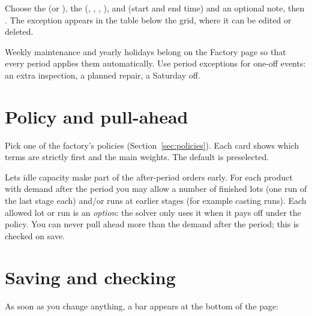 
Choose the  (or ), the  (, , ,
),  and  (start and end time) and an optional note, then . The exception
appears in the  table below the grid, where it can be edited or deleted.

\begin{tip}
Weekly maintenance and yearly holidays belong on the Factory page so that every period applies them
automatically. Use period exceptions for one-off events: an extra inspection, a planned repair, a Saturday off.
\end{tip}

\section{Policy and pull-ahead}\label{sec:pull-ahead}


\begin{description}[style=nextline, leftmargin=1.2em, font=\bfseries\color{brand}]
  \item[Objective policy] Pick one of the factory's policies (Section~\ref{sec:policies}). Each card shows
        which terms are strictly first and the main weights. The default is preselected.
  \item[Pull ahead for long-term orders] Lets idle capacity make part of the after-period orders early. For
        each product with demand after the period you may allow a number of finished lots (one run of the last
        stage each) and/or runs at earlier stages (for example casting runs). Each allowed lot or run is an
        \emph{option}: the solver only uses it when it pays off under the policy. You can never pull ahead more
        than the demand after the period; this is checked on save.
\end{description}

\section{Saving and checking}

As soon as you change anything, a bar appears at the bottom of the page:

